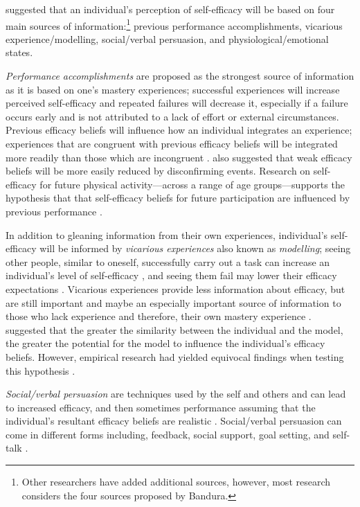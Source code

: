\documentclass[
  12pt,
  a4paper,
]{book}
\begin{document}
\citet{Bandura1982} suggested that an individual's perception of self-efficacy will be based on four main sources of information:\footnote{Other researchers \citep[e.g.,][]{Maddux1995} have added additional sources, however, most research considers the four sources proposed by Bandura.} previous performance accomplishments, vicarious experience/modelling, social/verbal persuasion, and physiological/emotional states.

\emph{Performance accomplishments} are proposed as the strongest source of information as it is based on one's mastery experiences; successful experiences will increase perceived self-efficacy and repeated failures will decrease it, especially if a failure occurs early and is not attributed to a lack of effort or external circumstances. Previous efficacy beliefs will influence how an individual integrates an experience; experiences that are congruent with previous efficacy beliefs will be integrated more readily than those which are incongruent \citep{Bandura1997, Cervone1990, Chase2001}. \citet{Bandura1997} also suggested that weak efficacy beliefs will be more easily reduced by disconfirming events. Research on self-efficacy for future physical activity---across a range of age groups---supports the hypothesis that that self-efficacy beliefs for future participation are influenced by previous performance \citep[e.g.,][]{Dawson2000, McAuley2006, Miller2002}.

In addition to gleaning information from their own experiences, individual's self-efficacy will be informed by \emph{vicarious experiences} also known as \emph{modelling}; seeing other people, similar to oneself, successfully carry out a task can increase an individual's level of self-efficacy \citep{Bandura1982, Lirgg1991}, and seeing them fail may lower their efficacy expectations \citep{Brown1978}. Vicarious experiences provide less information about efficacy, but are still important \citep{McCullagh2001} and maybe an especially important source of information to those who lack experience and therefore, their own mastery experience \citep{Weinberg2014}. \citet{Bandura1986} suggested that the greater the similarity between the individual and the model, the greater the potential for the model to influence the individual's efficacy beliefs. However, empirical research had yielded equivocal findings when testing this hypothesis \citep[cf.~][]{Samson2011}.

\emph{Social/verbal persuasion} are techniques used by the self and others and can lead to increased efficacy, and then sometimes performance assuming that the individual's resultant efficacy beliefs are realistic \citep{Bandura1982}. Social/verbal persuasion can come in different forms including, feedback, social support, goal setting, and self-talk \citep{Samson2011}.
\end{document}
